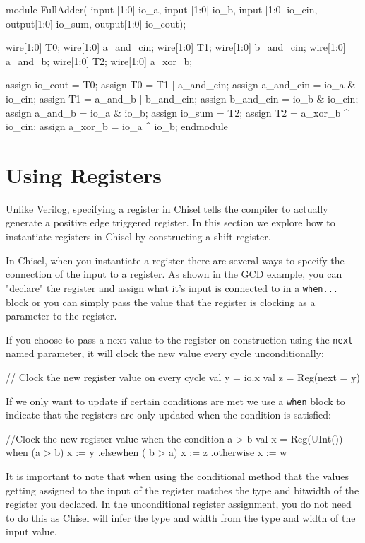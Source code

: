 \documentclass[twocolumn, 10pt]{article}
\begin{document}
\begin{bash}
module FullAdder(
    input [1:0] io_a,
    input [1:0] io_b,
    input [1:0] io_cin,
    output[1:0] io_sum,
    output[1:0] io_cout);

  wire[1:0] T0;
  wire[1:0] a_and_cin;
  wire[1:0] T1;
  wire[1:0] b_and_cin;
  wire[1:0] a_and_b;
  wire[1:0] T2;
  wire[1:0] a_xor_b;

  assign io_cout = T0;
  assign T0 = T1 | a_and_cin;
  assign a_and_cin = io_a & io_cin;
  assign T1 = a_and_b | b_and_cin;
  assign b_and_cin = io_b & io_cin;
  assign a_and_b = io_a & io_b;
  assign io_sum = T2;
  assign T2 = a_xor_b ^ io_cin;
  assign a_xor_b = io_a ^ io_b;
endmodule
\end{bash}

\section{Using Registers}

Unlike Verilog, specifying a register in Chisel tells the compiler to actually generate a positive edge triggered register. In this section we explore how to instantiate registers in Chisel by constructing a shift register.

In Chisel, when you instantiate a register there are several ways to specify the connection of the input to a register. As shown in the GCD example, you can "declare" the register and assign what it's input is connected to in a \verb+when...+ block or you can simply pass the value that the register is clocking as a parameter to the register.

If you choose to pass a next value to the register on construction using the \verb+next+ named parameter, it will clock the new value every cycle unconditionally:

\begin{scala}
// Clock the new register value on every cycle
val y = io.x
val z = Reg(next = y)
\end{scala}

If we only want to update if certain conditions are met we use a \verb+when+ block to indicate that the registers are only updated when the condition is satisfied:

\begin{scala}
//Clock the new register value when the condition a > b
val x = Reg(UInt())
when (a > b) { x := y }
.elsewhen ( b > a) {x := z}
.otherwise { x := w}
\end{scala}

It is important to note that when using the conditional method that the values getting assigned to the input of the register matches the type and bitwidth of the register you declared. In the unconditional register assignment, you do not need to do this as Chisel will infer the type and width from the type and width of the input value.
\end{document}

